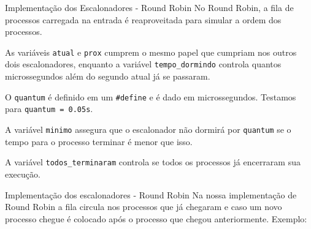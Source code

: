 \documentclass[10pt]{beamer}
\begin{document}
    \begin{frame}{Implementação dos Escalonadores - Round Robin}
        No Round Robin, a fila de processos carregada na entrada é reaproveitada para simular a ordem dos processos.

        As variáveis \texttt{atual} e \texttt{prox} cumprem o mesmo papel que cumpriam nos outros dois escalonadores,
        enquanto a variável \texttt{tempo\_dormindo} controla quantos microssegundos além do segundo atual já se passaram.

        O \texttt{quantum} é definido em um \texttt{\#define} e é dado em microssegundos. Testamos para \texttt{quantum = 0.05s}.

        A variável \texttt{minimo} assegura que o escalonador não dormirá por \texttt{quantum} se o tempo para o processo terminar é menor que isso.

        A variável \texttt{todos\_terminaram} controla se todos os processos já encerraram sua execução.
    \end{frame}
    \begin{frame}{Implementação dos escalonadores - Round Robin}
    Na nossa implementação de Round Robin a fila circula nos processos que já chegaram e caso um novo processo chegue é colocado após o processo que chegou anteriormente. Exemplo:
    \begin{figure}
    \end{figure}
    \begin{figure}
    \end{figure}    
    \end{frame}
\end{document}
